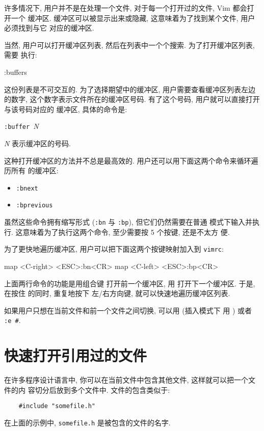 许多情况下, 用户并不是在处理一个文件, 对于每一个打开过的文件, Vim 都会打开一个
缓冲区. 缓冲区可以被显示出来或隐藏, 这意味着为了找到某个文件, 用户必须找到与它
对应的缓冲区.

当然, 用户可以打开缓冲区列表, 然后在列表中一个个搜索. 为了打开缓冲区列表, 需要
执行:
\begin{vimcode}
:buffers
\end{vimcode}

这份列表是不可交互的. 为了选择期望中的缓冲区, 用户需要查看缓冲区列表左边的数字,
这个数字表示文件所在的缓冲区号码. 有了这个号码, 用户就可以直接打开与该号码对应的
缓冲区, 具体的命令是:
\begin{vimcmdform}
\texttt{:buffer }\textit{N}
\end{vimcmdform}
\textit{N} 表示缓冲区的号码.

这种打开缓冲区的方法并不总是最高效的. 用户还可以用下面这两个命令来循环遍历所有
的缓冲区:
\begin{itemize}
    \item \texttt{:bnext}
    \item \texttt{:bprevious}
\end{itemize}

虽然这些命令拥有缩写形式 (\texttt{:bn} 与 \texttt{:bp}), 但它们仍然需要在普通
模式下输入并执行. 这意味着为了执行这两个命令, 至少需要按 5 个按键, 还是不太方
便.

为了更快地遍历缓冲区, 用户可以把下面这两个按键映射加入到 \texttt{vimrc}:
\begin{vimcode}
map <C-right> <ESC>:bn<CR>
map <C-left> <ESC>:bp<CR>
\end{vimcode}
上面两行命令的功能是用组合键  打开前一个缓冲区, 用
 打开下一个缓冲区. 于是, 在按住  的同时, 重复地按下
左/右方向键, 就可以快速地遍历缓冲区列表.

\begin{warning}
    如果用户只想在当前文件和前一个文件之间切换, 可以用  (插入模式下
    用  ) 或者 \texttt{:e \#}.
\end{warning}

\section{快速打开引用过的文件}
\label{sec:open_referenced_files_faster}

在许多程序设计语言中, 你可以在当前文件中包含其他文件, 这样就可以把一个文件的内
容切分后放到多个文件中. 文件的包含类似于:
\begin{verbatim}
    #include "somefile.h"
\end{verbatim}
在上面的示例中, \texttt{somefile.h} 是被包含的文件的名字.

